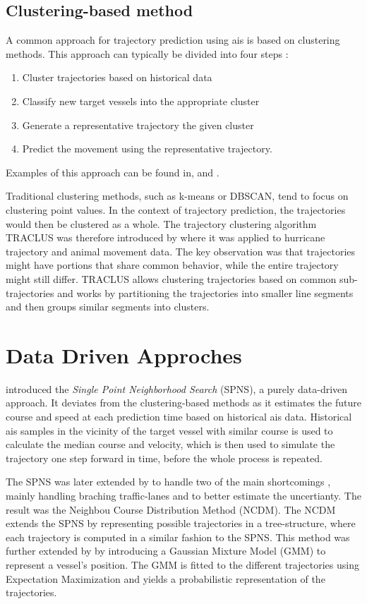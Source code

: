 \subsection{Clustering-based method}
A common approach for trajectory prediction using \acrshort{ais} is based on clustering methods. This approach can typically be divided into four steps \cite{dalsnes-hexeberg}:

\begin{enumerate}
    \item Cluster trajectories based on historical data
    \item Classify new target vessels into the appropriate cluster
    \item Generate a representative trajectory the given cluster
    \item Predict the movement using the representative trajectory.
\end{enumerate}

Examples of this approach can be found in\cite{palotta}, \cite{mazzarella} and \cite{mazzarella2}. 


Traditional clustering methods, such as k-means or DBSCAN, tend to focus on clustering point values. In the context of trajectory prediction, the trajectories would then be clustered as a whole. The trajectory clustering algorithm TRACLUS was therefore introduced by \cite{traclus} where it was applied to hurricane trajectory and animal movement data. The key observation was that trajectories might have portions that share common behavior, while the entire trajectory might still differ. TRACLUS allows clustering trajectories based on common sub-trajectories and works by partitioning the trajectories into smaller line segments and then groups similar segments into clusters. 

\section{Data Driven Approches}
\citeauthor{Hexeberg2017AISbasedVT} \cite{Hexeberg2017AISbasedVT} introduced the \textit{Single Point Neighborhood Search} (SPNS), a purely data-driven approach. It deviates from the clustering-based methods as it estimates the future course and speed at each prediction time based on historical \acrshort{ais} data. 
Historical \acrshort{ais} samples in the vicinity of the target vessel with similar course is used to calculate the median course and velocity, which is then used to simulate the trajectory one step forward in time, before the whole process is repeated. 

The SPNS was later extended by \citeauthor{hexeberg} \cite{hexeberg} to handle two of the main shortcomings \cite{dalsnes-hexeberg}, mainly handling braching traffic-lanes and to better estimate the uncertianty. The result was the Neighbou Course Distribution Method (NCDM). The NCDM extends the SPNS by representing possible trajectories in a tree-structure, where each trajectory is computed in a similar fashion to the SPNS. This method was further extended by \citeauthor{dalsnes-hexeberg}\cite{dalsnes-hexeberg} by introducing a Gaussian Mixture Model (GMM) to represent a vessel's position. The GMM is fitted to the different trajectories using Expectation Maximization and yields a probabilistic representation of the trajectories. 
